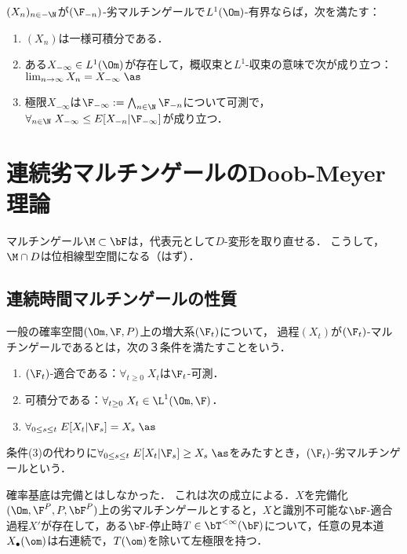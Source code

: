 \documentclass[uplatex,dvipdfmx]{jsreport}
\begin{document}
\begin{proposition}[劣マルチンゲールに対する逆向き収束定理]
    $(X_n)_{n\in-\N}$が$(\F_{-n})$-劣マルチンゲールで$L^1(\Om)$-有界ならば，次を満たす：
    \begin{enumerate}
        \item $(X_n)$は一様可積分である．
        \item ある$X_{-\infty}\in L^1(\Om)$が存在して，概収束と$L^1$-収束の意味で次が成り立つ：$\lim_{n\to\infty}X_n=X_{-\infty}\;\as$
        \item 極限$X_{-\infty}$は$\F_{-\infty}:=\bigwedge_{n\in\N}\F_{-n}$について可測で，$\forall_{n\in\N}\;X_{-\infty}\le E[X_{-n}|\F_{-\infty}]$が成り立つ．
    \end{enumerate}
\end{proposition}

\section{連続劣マルチンゲールのDoob-Meyer理論}

\begin{tcolorbox}[colframe=ForestGreen, colback=ForestGreen!10!white,breakable,colbacktitle=ForestGreen!40!white,coltitle=black,fonttitle=\bfseries\sffamily,
title=]
    マルチンゲール$\M\subset\bF$は，代表元として$D$-変形を取り直せる．
    こうして，$\M\cap D$は位相線型空間になる（はず）．
\end{tcolorbox}

\subsection{連続時間マルチンゲールの性質}

\begin{definition}
    一般の確率空間$(\Om,\F,P)$上の増大系$(\F_t)$について，
    過程$(X_t)$が$(\F_t)$-マルチンゲールであるとは，次の３条件を満たすことをいう．
    \begin{enumerate}[({M}1)]
        \item $(\F_t)$-適合である：$\forall_{t\ge0}\;X_t$は$\F_t$-可測．
        \item 可積分である：$\forall_{t\ge0}\;X_t\in\L^1(\Om,\F)$．
        \item $\forall_{0\le s\le t}\;E[X_t|\F_s]=X_s\;\as$
    \end{enumerate}
    条件(3)の代わりに$\forall_{0\le s\le t}\;E[X_t|\F_s]\ge X_s\;\as$をみたすとき，$(\F_t)$-劣マルチンゲールという．
\end{definition}
\begin{remark}
    確率基底は完備とはしなかった．
    これは次の成立による．$X$を完備化$(\Om,\F^P,P,\bF^P)$上の劣マルチンゲールとすると，$X$と識別不可能な$\bF$-適合過程$X'$が存在して，ある$\bF$-停止時$T\in\bT^{<\infty}(\bF)$について，任意の見本道$X_\bullet(\om)$は右連続で，$T(\om)$を除いて左極限を持つ．
\end{remark}
\end{document}
